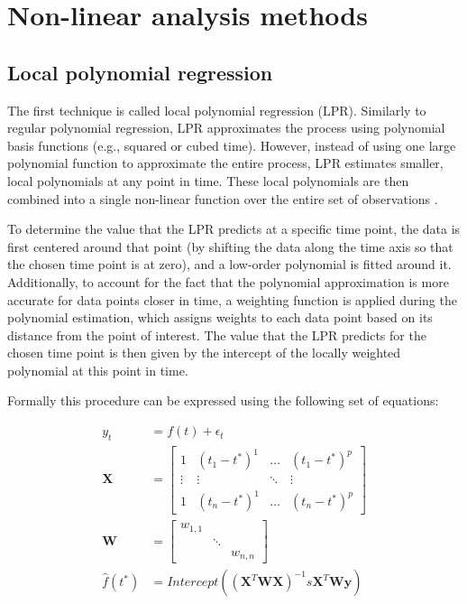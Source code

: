 \documentclass[man, floatsintext]{apa7}
\begin{document}
\section{Non-linear analysis methods}\label{method_introduction}

\subsection{Local polynomial regression}

The first technique is called local polynomial regression (LPR). Similarly to
regular polynomial regression, LPR approximates the process using polynomial
basis functions (e.g., squared or cubed time). However, instead of using one
large polynomial function to approximate the entire process, LPR estimates
smaller, local polynomials at any point in time. These local polynomials are
then combined into a single non-linear function over the entire set of
observations \parencite{fan_adaptive_1995, ruppert_multivariate_1994,
  fan_local_2018}.

To determine the value that the LPR predicts at a specific time point, the data
is first centered around that point (by shifting the data along the time axis
so that the chosen time point is at zero), and a low-order polynomial is fitted
around it. Additionally, to account for the fact that the polynomial
approximation is more accurate for data points closer in time, a weighting
function is applied during the polynomial estimation, which assigns weights to
each data point based on its distance from the point of interest. The value
that the LPR predicts for the chosen time point is then given by the intercept
of the locally weighted polynomial at this point in time.

Formally this procedure can be expressed using the following set of equations:

\begin{equation} \label{eq:lpr_equations}
  \begin{aligned}
    y_t          & = f(t) + \epsilon_t                            \\
    \textbf{X}   & =
    \begin{bmatrix}
      1      & (t_1 - t^*)^1 & \dots  & (t_1 - t^*)^p \\
      \vdots & \vdots        & \ddots & \vdots        \\
      1      & (t_n - t^*)^1 & \dots  & (t_n - t^*)^p
    \end{bmatrix} \\
    \textbf{W}   & =
    \begin{bmatrix}
      w_{1, 1} &        &          \\
               & \ddots &          \\
               &        & w_{n, n}
    \end{bmatrix}                               \\
    \hat{f}(t^*) & =
    Intercept((\textbf{X}^T\textbf{WX})^{-1}s\textbf{X}^T\textbf{Wy})
  \end{aligned}
\end{equation}
\end{document}
